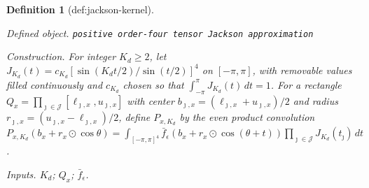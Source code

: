 \documentclass{article}
\newtheorem{definition}{Definition}
\begin{document}
\begin{definition}[def:jackson-kernel]\label{def:jackson-kernel}
\par\smallskip\noindent\emph{Defined object.} \texttt{positive order-\allowbreak{}four tensor Jackson approximation}
\par\smallskip\noindent\emph{Construction.} For integer \(K_d\geq2\), let \(J_{K_d}(t)=c_{K_d}[\sin(K_dt/2)/\sin(t/2)]^4\) on \([-\pi,\pi]\), with removable values filled continuously and \(c_{K_d}\) chosen so that \(\int_{-\pi}^{\pi}J_{K_d}(t)\,dt=1\). For a rectangle \(Q_x=\prod_{\jmath\in\mathcal J}[\ell_{\jmath,x},u_{\jmath,x}]\) with center \(b_{\jmath,x}=(\ell_{\jmath,x}+u_{\jmath,x})/2\) and radius \(r_{\jmath,x}=(u_{\jmath,x}-\ell_{\jmath,x})/2\), define \(P_{x,K_d}\) by the even product convolution \(P_{x,K_d}(b_x+r_x\odot\cos\theta)=\int_{[-\pi,\pi]^4}\bar f_\epsilon(b_x+r_x\odot\cos(\theta+t))\prod_{\jmath\in\mathcal J}J_{K_d}(t_{\jmath})\,dt\).
\par\smallskip\noindent\emph{Inputs.} \(K_d\); \(Q_x\); \(\bar f_\epsilon\).
\end{definition}
\end{document}
